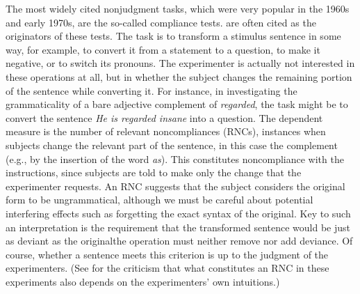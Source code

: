 The most widely cited nonjudgment tasks, which were very popular in the 1960s and early 1970s, are the so-called compliance tests. \citet{QuirkEtAl1966} are often cited as the originators of these tests. The task is to transform a stimulus sentence in some way, for example, to convert it from a statement to a question, to make it negative, or to switch its pronouns. The experimenter is actually not interested in these operations at all, but in whether the subject changes the remaining portion of the sentence while converting it. For instance, in investigating the grammaticality of a bare adjective complement of \textit{regarded}, the task might be to convert the sentence \textit{He is regarded insane} into a question. The dependent measure is the number of relevant noncompliances (RNCs), instances when subjects change the relevant part of the sentence, in this case the complement (e.g., by the insertion of the word \textit{as}). This constitutes noncompliance with the instructions, since subjects are told to make only the change that the experimenter requests. An RNC suggests that the subject considers the original form to be ungrammatical, although we must be careful about potential interfering effects such as forgetting the exact syntax of the original. Key to such an interpretation is the requirement that the transformed sentence would be just as deviant as the
original\schdash{}the operation must neither remove nor add deviance. Of course, whether a sentence meets this criterion is up to the judgment of the experimenters. (See \citet{Itkonen1979} for the criticism that what constitutes an RNC in these experiments also depends on the experimenters' own intuitions.)

